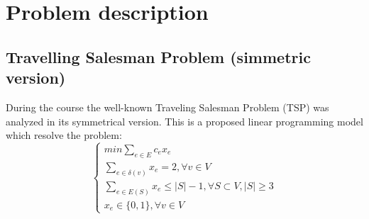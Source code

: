 \section{Problem description}

\subsection{Travelling Salesman Problem (simmetric version)}
During the course the well-known Traveling Salesman Problem (TSP) was analyzed in its symmetrical version.
This is a proposed linear programming model which resolve the problem:
\[
\begin{cases}
min \sum_{ e\in E } c_ex_e \\
\sum_{e\in \delta (v) } x_e = 2, \forall v \in V \\
\sum_{e\in E(S) } x_e \le |S|-1, \forall S \subset V, |S| \ge 3 \\
x_e \in \{0,1\}, \forall v \in V
\end{cases}
\]
